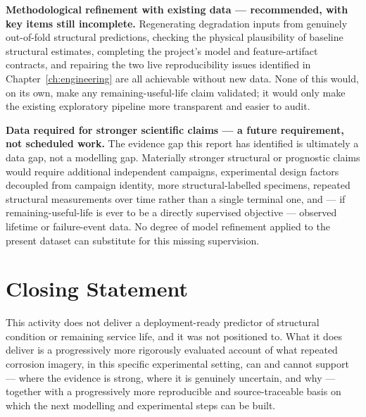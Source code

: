 \textbf{Methodological refinement with existing data — recommended, with
key items still incomplete.} Regenerating degradation inputs from genuinely out-of-fold
structural predictions, checking the physical plausibility of baseline
structural estimates, completing the project's model and feature-artifact
contracts, and repairing the two live reproducibility issues identified in
Chapter~\ref{ch:engineering} are all achievable without new data. None of
this would, on its own, make any remaining-useful-life claim validated;
it would only make the existing exploratory pipeline more transparent and
easier to audit.

\textbf{Data required for stronger scientific claims — a future
requirement, not scheduled work.} The evidence gap this report has
identified is ultimately a data gap, not a modelling gap. Materially
stronger structural or prognostic claims would require additional
independent campaigns, experimental design factors decoupled from
campaign identity, more structural-labelled specimens, repeated structural
measurements over time rather than a single terminal one, and — if
remaining-useful-life is ever to be a directly supervised objective —
observed lifetime or failure-event data. No degree of model refinement
applied to the present dataset can substitute for this missing
supervision.

\section{Closing Statement}
\label{sec:conclusions-closing}

This activity does not deliver a deployment-ready predictor of structural
condition or remaining service life, and it was not positioned to. What it
does deliver is a progressively more rigorously evaluated account of what
repeated corrosion imagery, in this specific experimental setting, can and
cannot support — where the evidence is strong, where it is genuinely
uncertain, and why — together with a progressively more reproducible and
source-traceable basis on which the next modelling and experimental steps
can be built.
